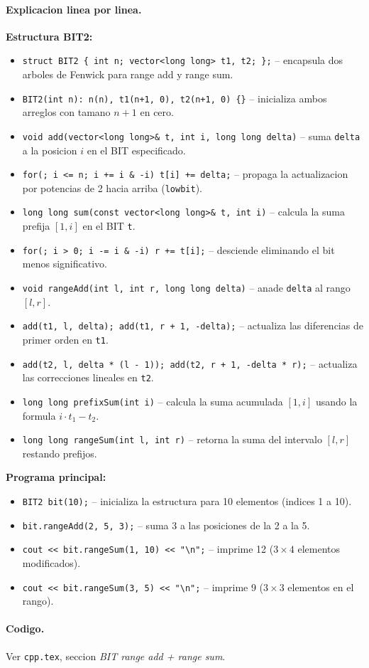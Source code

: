 \paragraph{Explicacion linea por linea.}
\textbf{Estructura BIT2:}
\begin{itemize}\setlength\itemsep{0pt}
	\item \verb|struct BIT2 { int n; vector<long long> t1, t2; };| -- encapsula dos arboles de Fenwick para range add y range sum.
	\item \verb|BIT2(int n): n(n), t1(n+1, 0), t2(n+1, 0) {}| -- inicializa ambos arreglos con tamano $n+1$ en cero.
	\item \verb|void add(vector<long long>& t, int i, long long delta)| -- suma \texttt{delta} a la posicion $i$ en el BIT especificado.
	\item \verb|for(; i <= n; i += i & -i) t[i] += delta;| -- propaga la actualizacion por potencias de 2 hacia arriba (\texttt{lowbit}).
	\item \verb|long long sum(const vector<long long>& t, int i)| -- calcula la suma prefija $[1, i]$ en el BIT \texttt{t}.
	\item \verb|for(; i > 0; i -= i & -i) r += t[i];| -- desciende eliminando el bit menos significativo.
	\item \verb|void rangeAdd(int l, int r, long long delta)| -- anade \texttt{delta} al rango $[l, r]$.
	\item \verb|add(t1, l, delta); add(t1, r + 1, -delta);| -- actualiza las diferencias de primer orden en \texttt{t1}.
	\item \verb|add(t2, l, delta * (l - 1)); add(t2, r + 1, -delta * r);| -- actualiza las correcciones lineales en \texttt{t2}.
	\item \verb|long long prefixSum(int i)| -- calcula la suma acumulada $[1, i]$ usando la formula $i \cdot t_1 - t_2$.
	\item \verb|long long rangeSum(int l, int r)| -- retorna la suma del intervalo $[l, r]$ restando prefijos.
\end{itemize}
\textbf{Programa principal:}
\begin{itemize}\setlength\itemsep{0pt}
	\item \verb|BIT2 bit(10);| -- inicializa la estructura para 10 elementos (indices 1 a 10).
	\item \verb|bit.rangeAdd(2, 5, 3);| -- suma 3 a las posiciones de la 2 a la 5.
	\item \verb|cout << bit.rangeSum(1, 10) << "\n";| -- imprime 12 ($3 \times 4$ elementos modificados).
	\item \verb|cout << bit.rangeSum(3, 5) << "\n";| -- imprime 9 ($3 \times 3$ elementos en el rango).
\end{itemize}

\paragraph{Codigo.}
Ver \texttt{cpp.tex}, seccion \textit{BIT range add + range sum}.

\vspace{0.5em}

